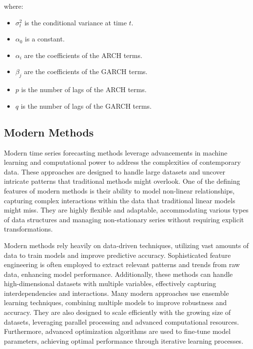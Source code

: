where:
\begin{itemize}
    \item \( \sigma_t^2 \) is the conditional variance at time \( t \).
    \item \( \alpha_0 \) is a constant.
    \item \( \alpha_i \) are the coefficients of the ARCH terms.
    \item \( \beta_j \) are the coefficients of the GARCH terms.
    \item \( p \) is the number of lags of the ARCH terms.
    \item \( q \) is the number of lags of the GARCH terms.
\end{itemize}
\vspace{10pt}



\subsection{Modern Methods}

Modern time series forecasting methods leverage advancements in machine learning and computational power to address the complexities of contemporary data. These approaches are designed to handle large datasets and uncover intricate patterns that traditional methods might overlook. One of the defining features of modern methods is their ability to model non-linear relationships, capturing complex interactions within the data that traditional linear models might miss. They are highly flexible and adaptable, accommodating various types of data structures and managing non-stationary series without requiring explicit transformations.

Modern methods rely heavily on data-driven techniques, utilizing vast amounts of data to train models and improve predictive accuracy. Sophisticated feature engineering is often employed to extract relevant patterns and trends from raw data, enhancing model performance. Additionally, these methods can handle high-dimensional datasets with multiple variables, effectively capturing interdependencies and interactions. Many modern approaches use ensemble learning techniques, combining multiple models to improve robustness and accuracy. They are also designed to scale efficiently with the growing size of datasets, leveraging parallel processing and advanced computational resources. Furthermore, advanced optimization algorithms are used to fine-tune model parameters, achieving optimal performance through iterative learning processes.
\vspace{10pt}


